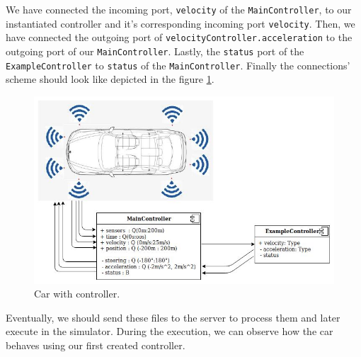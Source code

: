 \bigskip
We have connected the incoming port, \texttt{velocity} of the \texttt{MainController}, to our instantiated controller and it's corresponding incoming port \texttt{velocity}. Then, we have connected the outgoing port of \texttt{velocityController.acceleration} to the outgoing port of our \texttt{MainController}. Lastly, the \texttt{status} port of the \texttt{ExampleController} to \texttt{status} of the \texttt{MainController}.\newline
Finally the connections' scheme should look like depicted in the figure \ref{fig:controller}.
\begin{figure}[h!]
    \centering
    \includegraphics[width=0.9\linewidth]{src/pic/car-with-controller}
    \caption{Car with controller.}
    \label{fig:controller}
\end{figure} \newline
Eventually, we should send these files to the server to process them and later execute in the simulator. During the execution, we can observe how the car behaves using our first created controller.

